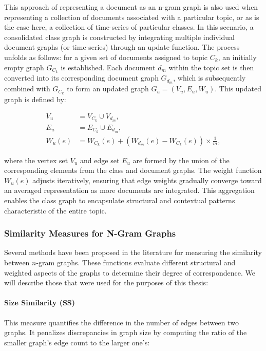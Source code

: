 \documentclass{article}
\begin{document}
This approach of representing a document as an n-gram graph is also used when representing a collection of documents associated with a particular topic, or as is the case here, a collection of time-series of particular classes. In this scenario, a consolidated class graph is constructed by integrating multiple individual document graphs (or time-series) through an update function. The process unfolds as follows: for a given set of documents assigned to topic $C_k$, an initially empty graph $G_{C_k}$ is established. Each document $d_m$ within the topic set is then converted into its corresponding document graph $G_{d_m}$, which is subsequently combined with $G_{C_k}$ to form an updated graph $G_u = (V_u, E_u, W_u)$. This updated graph is defined by:

\begin{align*}
    V_u &= V_{C_k} \cup V_{d_m}, \\
    E_u &= E_{C_k} \cup E_{d_m}, \\
    W_u(e) &= W_{C_k}(e) + (W_{d_m}(e) - W_{C_k}(e)) \times \frac{1}{m},
\end{align*}

where the vertex set $V_u$ and edge set $E_u$ are formed by the union of the corresponding elements from the class and document graphs. The weight function $W_u(e)$ adjusts iteratively, ensuring that edge weights gradually converge toward an averaged representation as more documents are integrated. This aggregation enables the class graph to encapsulate structural and contextual patterns characteristic of the entire topic.

\subsubsection{Similarity Measures for N-Gram Graphs} \label{sec:similarity_measures}

Several methods have been proposed in the literature for measuring the similarity between \( n \)-gram graphs. These functions evaluate different structural and weighted aspects of the graphs to determine their degree of correspondence. We will describe those that were used for the purposes of this thesis:

\paragraph{Size Similarity (SS)}

This measure quantifies the difference in the number of edges between two graphs. It penalizes discrepancies in graph size by computing the ratio of the smaller graph's edge count to the larger one's:
\end{document}
